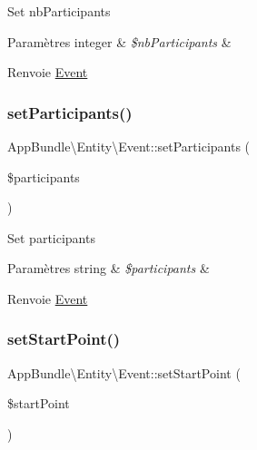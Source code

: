 Set nb\+Participants


\begin{DoxyParams}[1]{Paramètres}
integer & {\em \$nb\+Participants} & \\
\hline
\end{DoxyParams}
\begin{DoxyReturn}{Renvoie}
\hyperlink{classAppBundle_1_1Entity_1_1Event}{Event} 
\end{DoxyReturn}
\mbox{\label{classAppBundle_1_1Entity_1_1Event_a2104abbe1e799f1d01fa880a556c4b57}} 
\subsubsection{\texorpdfstring{set\+Participants()}{setParticipants()}}
{\footnotesize\ttfamily App\+Bundle\textbackslash{}\+Entity\textbackslash{}\+Event\+::set\+Participants (\begin{DoxyParamCaption}\item[{}]{\$participants }\end{DoxyParamCaption})}

Set participants


\begin{DoxyParams}[1]{Paramètres}
string & {\em \$participants} & \\
\hline
\end{DoxyParams}
\begin{DoxyReturn}{Renvoie}
\hyperlink{classAppBundle_1_1Entity_1_1Event}{Event} 
\end{DoxyReturn}
\mbox{\label{classAppBundle_1_1Entity_1_1Event_a2b787c614b9f5e7f8908a33cb3f1c6fc}} 
\subsubsection{\texorpdfstring{set\+Start\+Point()}{setStartPoint()}}
{\footnotesize\ttfamily App\+Bundle\textbackslash{}\+Entity\textbackslash{}\+Event\+::set\+Start\+Point (\begin{DoxyParamCaption}\item[{\textbackslash{}\hyperlink{classAppBundle_1_1Entity_1_1Location}{App\+Bundle\textbackslash{}\+Entity\textbackslash{}\+Location}}]{\$start\+Point }\end{DoxyParamCaption})}

